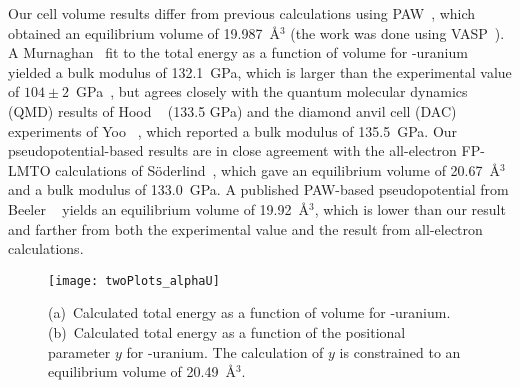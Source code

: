 Our cell volume results differ from previous calculations using
PAW~\cite{beeler2013first}, which obtained an equilibrium volume of
19.987~\AA$^3$ (the work was done using VASP~\cite{kresse1993ab, Kresse1996a, Kresse1996b}). A Murnaghan~\cite{murnaghan1944compressibility} fit to the
total energy as a function of volume for \textalpha-uranium yielded a bulk
modulus of 132.1~GPa, which is larger than the experimental value of
$104 \pm 2$~GPa~\cite{le2003structural},
but agrees closely with the quantum molecular dynamics (QMD) results of
Hood \etal~\cite{hood2008quantum} (133.5 GPa)
and the diamond anvil cell (DAC) experiments of Yoo \etal~\cite{yoo1998phase},
which reported a bulk modulus of 135.5~GPa. Our pseudopotential-based results
are in close agreement with the all-electron FP-LMTO calculations of
S{\"o}derlind~\cite{soderlind2002first}, which gave an equilibrium volume of
20.67~\AA$^3$ and a bulk modulus of 133.0~GPa. A published PAW-based
pseudopotential from Beeler \etal~\cite{beeler2013first} yields an equilibrium
volume of 19.92~\AA$^3$, which is lower than our result and farther from both
the experimental value and the result from all-electron calculations.

\begin{figure}
	\centering
    \texttt{[image: twoPlots\_alphaU]}
    \caption[(a)~Calculated total energy as a function of volume for
        \textalpha-uranium. (b)~Calculated total energy as a function of the
        positional parameter $y$ for \textalpha-uranium.]{(a)~Calculated total energy as a function of volume for
        \textalpha-uranium. (b)~Calculated total energy as a function of the
        positional parameter $y$ for \textalpha-uranium. The calculation of $y$
        is constrained to an equilibrium volume of 20.49~\AA$^3$.}
	\label{fig:alpha}
\end{figure}

